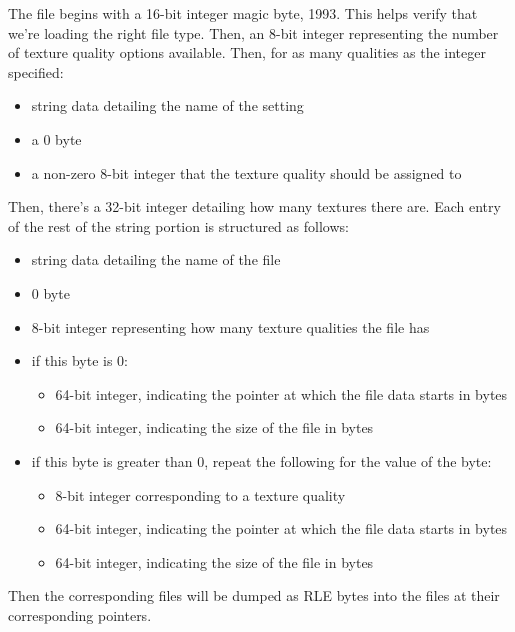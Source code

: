 \documentclass{report}
\begin{document}
The file begins with a 16-bit integer magic byte, 1993. This helps verify that we're loading the right file type. Then, an 8-bit integer representing the number of texture quality options available. Then, for as many qualities as the integer specified:
\begin{itemize}
\item string data detailing the name of the setting
\item a 0 byte
\item a non-zero 8-bit integer that the texture quality should be assigned to
\end{itemize}

Then, there's a 32-bit integer detailing how many textures there are. Each entry of the rest of the string portion is structured as follows:
\begin{itemize}
\item string data detailing the name of the file
\item 0 byte
\item 8-bit integer representing how many texture qualities the file has
\item if this byte is 0:
\begin{itemize}
    \item 64-bit integer, indicating the pointer at which the file data starts in bytes
    \item 64-bit integer, indicating the size of the file in bytes
\end{itemize}
\item if this byte is greater than 0, repeat the following for the value of the byte:
\begin{itemize}
    \item 8-bit integer corresponding to a texture quality
    \item 64-bit integer, indicating the pointer at which the file data starts in bytes
    \item 64-bit integer, indicating the size of the file in bytes
\end{itemize}
\end{itemize}
Then the corresponding files will be dumped as RLE bytes into the files at their corresponding pointers.
\end{document}
